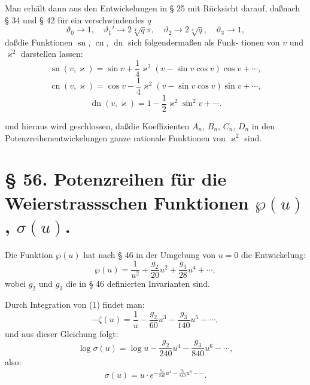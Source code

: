 \documentclass[12pt,a4paper]{article}
\theoremstyle{definition}
\begin{document}
Man erh\"{a}lt dann aus den Entwickelungen in \S{} 25 mit R\"{u}cksicht
darauf, da\ss nach \S{} 34 und \S{} 42 f\"{u}r ein verschwindendes $q$
\begin{equation}\tag{3}
\vartheta_0 \to 1, \quad \vartheta_1' \to 2\sqrt[4]{q}\pi, \quad
\vartheta_2 \to 2\sqrt[4]{q}, \quad \vartheta_3 \to 1,
\end{equation}
da\ss die Funktionen $\operatorname{sn}$, $\operatorname{cn}$, $\operatorname{dn}$ sich folgenderma\ss en als Funk-
tionen von $v$ und $\varkappa^2$ darstellen lassen:
\begin{equation}\tag{4}
\operatorname{sn}(v, \varkappa) = \sin v + \frac{1}{4}\varkappa^2(v - \sin v \cos v)\cos v + \cdots,
\end{equation}
\begin{equation}\tag{5}
\operatorname{cn}(v, \varkappa) = \cos v - \frac{1}{4}\varkappa^2(v - \sin v \cos v)\sin v + \cdots,
\end{equation}
\begin{equation}\tag{6}
\operatorname{dn}(v, \varkappa) = 1 - \frac{1}{2}\varkappa^2 \sin^2 v + \cdots.
\end{equation}

und hieraus wird geschlossen, da\ss die Koeffizienten $A_n$, $B_n$, $C_n$, $D_n$
in den Potenzreihenentwickelungen ganze rationale Funktionen
von $\varkappa^2$ sind.

\section*{\S{} 56. Potenzreihen f\"{u}r die Weierstrassschen Funktionen $\wp(u)$, $\sigma(u)$.}

Die Funktion $\wp(u)$ hat nach \S{} 46 in der Umgebung von
$u = 0$ die Entwickelung:
\begin{equation}\tag{1}
\wp(u) = \frac{1}{u^2} + \frac{g_2}{20}u^2 + \frac{g_3}{28}u^4 + \cdots,
\end{equation}
wobei $g_2$ und $g_3$ die in \S{} 46 definierten Invarianten sind.

Durch Integration von (1) findet man:
\begin{equation}\tag{2}
-\zeta(u) = \frac{1}{u} - \frac{g_2}{60}u^3 - \frac{g_3}{140}u^5 - \cdots,
\end{equation}
und aus dieser Gleichung folgt:
\begin{equation}\tag{3}
\log\sigma(u) = \log u - \frac{g_2}{240}u^4 - \frac{g_3}{840}u^6 - \cdots,
\end{equation}
also:
\begin{equation}\tag{4}
\sigma(u) = u \cdot e^{-\frac{g_2}{240}u^4 - \frac{g_3}{840}u^6 - \cdots}.
\end{equation}
\end{document}
